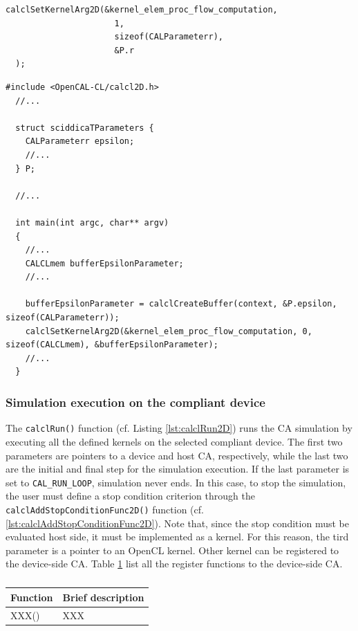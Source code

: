 \begin{lstlisting}[float,floatplacement=H, label=lst:calclSetKernelArg2D, caption=The calclSetKernelArg2D() function., numbers=none]
  calclSetKernelArg2D(&kernel_elem_proc_flow_computation,
                      1,
                      sizeof(CALParameterr),
                      &P.r
  );
\end{lstlisting}


\begin{lstlisting}[float,floatplacement=H, label=lst:calclKernelParameters, caption=Passing parametrs to kernel.]
  #include <OpenCAL-CL/calcl2D.h>
  //...
  
  struct sciddicaTParameters {
    CALParameterr epsilon;
    //...
  } P;

  //...
  
  int main(int argc, char** argv)
  {
    //...
    CALCLmem bufferEpsilonParameter;
    //...

    bufferEpsilonParameter = calclCreateBuffer(context, &P.epsilon, sizeof(CALParameterr));
    calclSetKernelArg2D(&kernel_elem_proc_flow_computation, 0, sizeof(CALCLmem), &bufferEpsilonParameter);    
    //...
  }
\end{lstlisting}


\subsubsection{Simulation execution on the compliant device}

The \verb'calclRun()' function (cf. Listing \ref{lst:calclRun2D}) runs
the CA simulation by executing all the defined kernels on the selected
compliant device. The first two parameters are pointers to a device
and host CA, respectively, while the last two are the initial and
final step for the simulation execution. If the last parameter is set
to \verb'CAL_RUN_LOOP', simulation never ends. In this case, to stop
the simulation, the user must define a stop condition criterion
through the \verb'calclAddStopConditionFunc2D()' function
(cf. \ref{lst:calclAddStopConditionFunc2D}). Note that, since the stop
condition must be evaluated host side, it must be implemented as a
kernel. For this reason, the tird parameter is a pointer to an OpenCL
kernel. Other kernel can be registered to the device-side CA. Table
\ref{tab:XXX} list all the register functions to the device-side CA.


\begin{table}
  \centering
  \begin{footnotesize}
  \begin{tabular}{l|l}
    \hline
    Function & Brief description\\
    \hline
    \hline
    XXX()                 & XXX \\
    \hline
    \end{tabular}
    \end{footnotesize}
  \caption{}
  \label{tab:XXX}
\end{table} 



